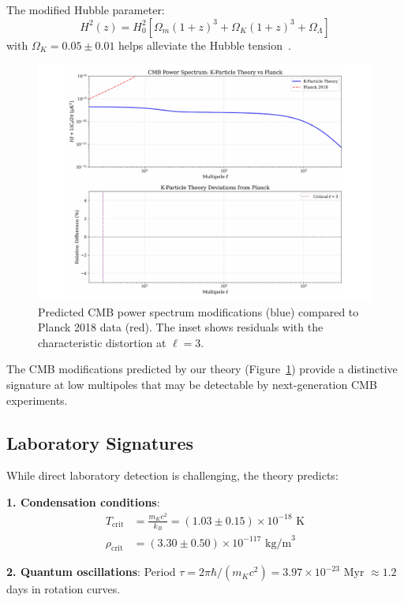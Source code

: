 \documentclass[aps,prd,twocolumn,showpacs,superscriptaddress,groupedaddress,nofootinbib]{revtex4-2}
\begin{document}
The modified Hubble parameter:
\begin{equation}
H^2(z) = H_0^2\left[\Omega_m(1+z)^3 + \Omega_K(1+z)^3 + \Omega_\Lambda\right]
\end{equation}
with $\Omega_K = 0.05 \pm 0.01$ helps alleviate the Hubble tension~\cite{DiValentino2021,Perivolaropoulos2022}.


\begin{figure}[htbp]
\centering
\includegraphics[width=0.9\columnwidth]{cmb_spectrum.pdf}
\caption{Predicted CMB power spectrum modifications (blue) compared to Planck 2018 data (red). The inset shows residuals with the characteristic distortion at $\ell = 3$.}
\label{fig:cmb}
\end{figure}

The CMB modifications predicted by our theory (Figure~\ref{fig:cmb}) provide a distinctive signature at low multipoles that may be detectable by next-generation CMB experiments.

\subsection{Laboratory Signatures}

While direct laboratory detection is challenging, the theory predicts:

\textbf{1. Condensation conditions}:
\begin{align}
T_{\text{crit}} &= \frac{m_K c^2}{k_B} = (1.03 \pm 0.15) \times 10^{-18} \text{ K} \\
\rho_{\text{crit}} &= (3.30 \pm 0.50) \times 10^{-117} \text{ kg/m}^3
\end{align}

\textbf{2. Quantum oscillations}: Period $\tau = 2\pi\hbar/(m_K c^2) = 3.97 \times 10^{-23}$ Myr $\approx 1.2$ days in rotation curves.
\end{document}

